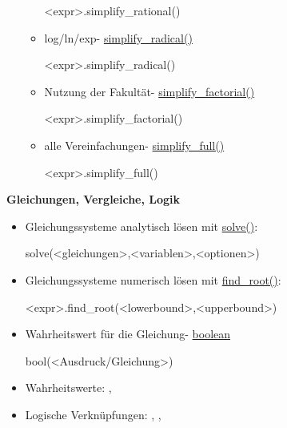 \documentclass[a4paper,9pt,DIV15,twocolumn]{scrartcl}
\begin{document}
\begin{itemize}
\begin{itemize}
       \begin{sagein}
<expr>.simplify_rational() 
       \end{sagein}
        \item log/ln/exp- \href{https://sage.math.uni-goettingen.de/doc/static/reference/sage/symbolic/expression.html?highlight=simplify_full#sage.symbolic.expression.Expression.simplify_radical}{simplify\_radical()}
       \begin{sagein}
<expr>.simplify_radical() 
       \end{sagein}
        \item Nutzung der Fakultät- \href{https://sage.math.uni-goettingen.de/doc/static/reference/sage/symbolic/expression.html?highlight=simplify_full#sage.symbolic.expression.Expression.simplify_factorial}{simplify\_factorial()}
       \begin{sagein}
<expr>.simplify_factorial()
       \end{sagein}
        \item alle Vereinfachungen- \href{https://sage.math.uni-goettingen.de/doc/static/reference/sage/symbolic/expression.html?highlight=simplify_full#sage.symbolic.expression.Expression.simplify_full}{simplify\_full()}
       \begin{sagein}
<expr>.simplify_full()
       \end{sagein}
       \end{itemize}

  \end{itemize}

\textbf{Gleichungen, Vergleiche, Logik}

\begin{itemize}
 \item Gleichungssysteme analytisch lösen mit \href{https://sage.math.uni-goettingen.de/doc/static/reference/sage/symbolic/relation.html?highlight=symbolic.relation#sage.symbolic.relation.solve}{solve()}:
\begin{sagein}
 solve(<gleichungen>,<variablen>,<optionen>)
\end{sagein}
\item Gleichungssysteme numerisch lösen mit \href{https://sage.math.uni-goettingen.de/doc/static/reference/sage/numerical/optimize.html?highlight=numerical.optimize#sage.numerical.optimize.find_root}{find\_root()}:
    \begin{sagein}
<expr>.find_root(<lowerbound>,<upperbound>)
    \end{sagein}

 \item Wahrheitswert für die Gleichung- \href{http://docs.python.org/library/stdtypes.html#boolean-operations-and-or-not}{boolean}
     \begin{sagein}
bool(<Ausdruck/Gleichung>)   
     \end{sagein}
 \item Wahrheitswerte: , 
 \item Logische Verknüpfungen: , , 
\end{itemize}
\end{document}
